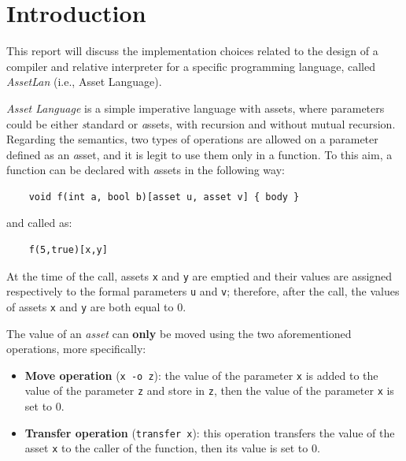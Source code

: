 \documentclass[11pt]{article} %
\begin{document}
\pagestyle{empty}
\clearpage
\tableofcontents
\thispagestyle{empty}
\newpage

\section{Introduction}
This report will discuss the implementation choices related to the design of a compiler and relative interpreter for a specific programming language, called \emph{AssetLan} (i.e., Asset Language). 

\medskip

\emph{Asset Language} is a simple imperative language with assets, where parameters could be either {\emph standard} or {\emph assets}, with recursion and without mutual recursion. Regarding the semantics, two types of operations are allowed on a parameter defined as an {\emph asset}, and it is legit to use them only in a function. To this aim, a function can be declared  with {\emph assets} in the following way:
\begin{verbatim}
    void f(int a, bool b)[asset u, asset v] { body }
\end{verbatim} 
and called as: 
\begin{verbatim}
    f(5,true)[x,y]
\end{verbatim}
At the time of the call, assets \verb|x| and \verb|y| are emptied and their values are assigned respectively to the formal parameters \verb|u| and \verb|v|; therefore, after the call, the values of assets \verb|x| and \verb|y| are both equal to 0.

\medskip

The value of an \emph{asset} can \textbf{only} be moved using the two aforementioned operations, more specifically: 
\begin{itemize}
\item \textbf{Move operation} (\verb|x -o z|): the value of the parameter \verb|x| is added to the value of the parameter \verb|z| and store in \verb|z|, then the value of the parameter \verb|x| is set to 0.
\item \textbf{Transfer operation} (\verb|transfer x|): this operation transfers the value of the asset \verb|x| to the caller of the function, then its value is set to 0.
\end{itemize}
\end{document}
